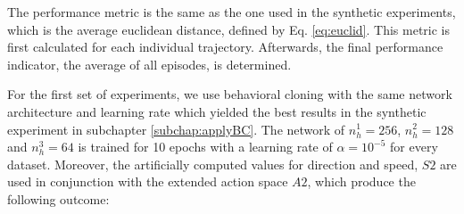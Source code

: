 The performance metric is the same as the one used in the synthetic experiments, which is the average euclidean distance, defined by Eq.  \ref{eq:euclid}. This metric is first calculated for each individual trajectory. Afterwards, the final performance indicator, the average of all episodes, is determined.
\par
For the first set of experiments, we use behavioral cloning with the same network architecture and learning rate which yielded the best results in the synthetic experiment in subchapter \ref{subchap:applyBC}. The network of $n_h^1=256$, $n_h^2=128$ and $n_h^3=64$ is trained for 10 epochs with a learning rate of $\alpha=10^{-5}$ for every dataset. Moreover, the artificially computed values for direction and speed, $S2$ are used in conjunction with the extended action space $A2$, which produce the following outcome:

